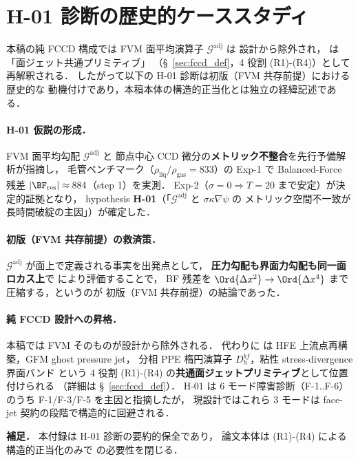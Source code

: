 %
%
\section{H-01 診断の歴史的ケーススタディ}
\label{app:fccd_motivation_h01}
\label{sec:fccd_motivation_h01}%

\begin{remark}[本節の位置付け]
本稿の純 FCCD 構成では FVM 面平均演算子 $\mathcal{G}^{\text{adj}}$ は
設計から除外され，{\FCCD} は「面ジェット共通プリミティブ」
（§~\ref{sec:fccd_def}，4 役割 (R1)-(R4)）として再解釈される．
したがって以下の H-01 診断は初版（FVM 共存前提）における歴史的な
動機付けであり，本稿本体の構造的正当化とは独立の経緯記述である．
\end{remark}

\paragraph{H-01 仮説の形成．}
FVM 面平均勾配 $\mathcal{G}^{\text{adj}}$ と
節点中心 CCD 微分の\textbf{メトリック不整合}を先行予備解析が指摘し，
毛管ベンチマーク（$\rho_\text{liq}/\rho_\text{gas}=833$）の Exp-1 で
Balanced-Force 残差 $|\BF_{\text{res}}|\approx 884$（step 1）を実測．
Exp-2（$\sigma=0 \Rightarrow T=20$ まで安定）が決定的証拠となり，
hypothesis \textbf{H-01}（「$\mathcal{G}^{\text{adj}}$ と $\sigma\kappa\nabla\psi$ の
メトリック空間不一致が長時間破綻の主因」）が確定した．

\paragraph{初版（FVM 共存前提）の救済策．}
$\mathcal{G}^{\text{adj}}$ が面上で定義される事実を出発点として，
\textbf{圧力勾配も界面力勾配も同一面ロカス上}で {\FCCD} により評価することで，
BF 残差を $\Ord{\Delta x^2} \to \Ord{\Delta x^4}$ まで圧縮する，というのが
初版（FVM 共存前提）の結論であった．

\paragraph{純 FCCD 設計への昇格．}
本稿では FVM そのものが設計から除外される．
代わりに {\FCCD} は HFE 上流点再構築，GFM ghost pressure jet，
分相 PPE 楕円演算子 $D_h^{bf}$，粘性 stress-divergence 界面バンド
という 4 役割 (R1)-(R4) の\textbf{共通面ジェットプリミティブ}として位置付けられる
（詳細は §~\ref{sec:fccd_def}）．
H-01 は 6 モード障害診断（F-1..F-6）のうち F-1/F-3/F-5 を主因と指摘したが，
現設計ではこれら 3 モードは face-jet 契約の段階で構造的に回避される．

\medskip
\noindent\textbf{補足．}
本付録は H-01 診断の要約的保全であり，
論文本体は (R1)-(R4) による構造的正当化のみで {\FCCD} の必要性を閉じる．

